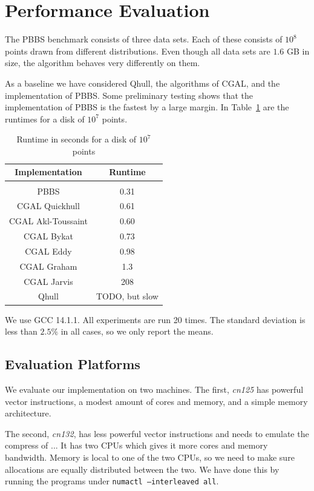 \section{Performance Evaluation}\label{sec:perf}

The PBBS benchmark consists of three data sets. Each of these consists of
$10^8$ points drawn from different distributions. Even though all data sets
are $1.6$ GB in size, the algorithm behaves very differently on them.

As a baseline we have considered Qhull, the algorithms of CGAL,
and the implementation of PBBS. Some preliminary testing shows that the
implementation of PBBS is the fastest by a large margin. In
Table~\ref{table:reference} are the runtimes for a disk of $10^7$ points.

\begin{table}[ht]
    \caption{Runtime in seconds for a disk of $10^7$ points}
    \label{table:reference}
    \begin{tabular}{c | c }
     Implementation & Runtime \\ 
     \hline \\
     PBBS & 0.31 \\  
     CGAL Quickhull & 0.61 \\
     CGAL Akl-Toussaint & 0.60 \\
     CGAL Bykat & 0.73 \\
     CGAL Eddy & 0.98 \\
     CGAL Graham & 1.3 \\
     CGAL Jarvis & 208 \\
     Qhull & TODO, but slow \\
    \end{tabular}
\end{table}

We use GCC 14.1.1. All experiments are run 20 times. The standard deviation is 
less than $2.5\%$ in all cases, so we only report the means.

\subsection{Evaluation Platforms}

We evaluate our implementation on two machines. The first, \textit{cn125}
has powerful vector instructions, a modest amount of cores and memory, and a 
simple memory architecture. 

The second, \textit{cn132}, has less powerful vector instructions and needs
to emulate the compress of ... It has two CPUs which gives it more cores
and memory bandwidth. Memory is local to one of the two CPUs, so we need
to make sure allocations are equally distributed between the two. We have
done this by running the programs under \texttt{numactl --interleaved all}.

